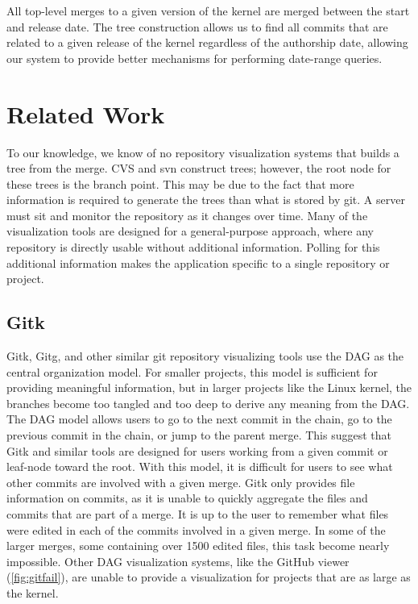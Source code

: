 \documentclass[conference, draftclsnofoot]{IEEEtran}
\begin{document}
All top-level merges to a given version of the kernel are merged between the
start and release date. The tree construction allows us to find all commits that are
related to a given release of the kernel regardless of the authorship date, allowing
our system to provide better mechanisms for performing date-range queries.

\section{Related Work}
To our knowledge, we know of no repository visualization systems that builds a tree
from the merge. CVS and svn construct trees; however, the root node for these trees
is the branch point. This may be due to the fact that more information is required
to generate the trees than what is stored by git. A server must sit and monitor the
repository as it changes over time. Many of the visualization tools are designed for
a general-purpose approach, where any repository is directly usable without
additional information. Polling for this additional information makes the
application specific to a single repository or project.

\subsection{Gitk}
Gitk, Gitg, and other similar git repository visualizing tools use the DAG as
the central organization model. For smaller projects, this model is sufficient
for providing meaningful information, but in larger projects like the Linux
kernel, the branches become too tangled and too deep to derive any meaning from
the DAG. The DAG model allows users to go to the next commit in the chain, go
to the previous commit in the chain, or jump to the parent merge. This suggest
that Gitk and similar tools are designed for users working from a given commit or
leaf-node toward the root.  With this model, it is difficult for users to see what
other commits are involved with a given merge. Gitk only provides file information
on commits, as it is unable to quickly aggregate the files and commits that are part
of a merge. It is up to the user to remember what files were edited in each of the
commits involved in a given merge. In some of the larger merges, some containing
over 1500 edited files, this task become nearly impossible.  %
Other DAG visualization systems, like the GitHub viewer (\ref{fig:gitfail}), are
unable to provide a visualization for projects that are as large as the kernel.
\end{document}

